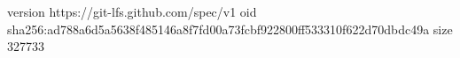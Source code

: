 version https://git-lfs.github.com/spec/v1
oid sha256:ad788a6d5a5638f485146a8f7fd00a73fcbf922800ff533310f622d70dbdc49a
size 327733
